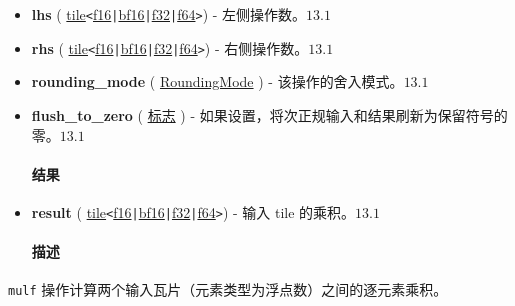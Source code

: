 \documentclass{article}
\begin{document}
\begin{itemize}
\item \textbf{lhs} ( \href{https://docs.nvidia.com/cuda/tile-ir/latest/sections/types.html#type-tile}{tile}\texttt{<}\href{https://docs.nvidia.com/cuda/tile-ir/latest/sections/types.html#subsection-element-types}{f16}\texttt{|}\href{https://docs.nvidia.com/cuda/tile-ir/latest/sections/types.html#subsection-element-types}{bf16}\texttt{|}\href{https://docs.nvidia.com/cuda/tile-ir/latest/sections/types.html#subsection-element-types}{f32}\texttt{|}\href{https://docs.nvidia.com/cuda/tile-ir/latest/sections/types.html#subsection-element-types}{f64}\texttt{>}) - 左侧操作数。$\boxed{13.1}$
\item \textbf{rhs} ( \href{https://docs.nvidia.com/cuda/tile-ir/latest/sections/types.html#type-tile}{tile}\texttt{<}\href{https://docs.nvidia.com/cuda/tile-ir/latest/sections/types.html#subsection-element-types}{f16}\texttt{|}\href{https://docs.nvidia.com/cuda/tile-ir/latest/sections/types.html#subsection-element-types}{bf16}\texttt{|}\href{https://docs.nvidia.com/cuda/tile-ir/latest/sections/types.html#subsection-element-types}{f32}\texttt{|}\href{https://docs.nvidia.com/cuda/tile-ir/latest/sections/types.html#subsection-element-types}{f64}\texttt{>}) - 右侧操作数。$\boxed{13.1}$
\item \textbf{rounding\_mode} ( \href{https://docs.nvidia.com/cuda/tile-ir/latest/sections/operations.html#op-attribute-cuda-tile-mulf-roundingmode-attr}{RoundingMode} ) - 该操作的舍入模式。$\boxed{13.1}$
\item \textbf{flush\_to\_zero} ( \href{https://docs.nvidia.com/cuda/tile-ir/latest/sections/operations.html#type-flag}{标志} ) - 如果设置，将次正规输入和结果刷新为保留符号的零。$\boxed{13.1}$




\paragraph{结果}


\item \textbf{result} ( \href{https://docs.nvidia.com/cuda/tile-ir/latest/sections/types.html#type-tile}{tile}\texttt{<}\href{https://docs.nvidia.com/cuda/tile-ir/latest/sections/types.html#subsection-element-types}{f16}\texttt{|}\href{https://docs.nvidia.com/cuda/tile-ir/latest/sections/types.html#subsection-element-types}{bf16}\texttt{|}\href{https://docs.nvidia.com/cuda/tile-ir/latest/sections/types.html#subsection-element-types}{f32}\texttt{|}\href{https://docs.nvidia.com/cuda/tile-ir/latest/sections/types.html#subsection-element-types}{f64}\texttt{>}) - 输入 tile 的乘积。$\boxed{13.1}$




\paragraph{描述}


\end{itemize}
\texttt{mulf} 操作计算两个输入瓦片（元素类型为浮点数）之间的逐元素乘积。
\end{document}

